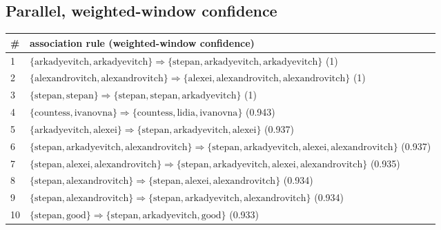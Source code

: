 \begin{appendices}
\section{Parallel, weighted-window confidence}
\label{appendix:rules-par-wwi}

\begin{longtable}{p{20pt}|p{\dimexpr\textwidth-20pt-\tabcolsep\relax}}
\# & association rule (weighted-window confidence) \\
\hline
1 & $ \{ \text{arkadyevitch},\allowbreak\text{arkadyevitch} \} \Rightarrow \{ \text{stepan},\allowbreak\text{arkadyevitch},\allowbreak\text{arkadyevitch} \} $ (1) \\
2 & $ \{ \text{alexandrovitch},\allowbreak\text{alexandrovitch} \} \Rightarrow \{ \text{alexei},\allowbreak\text{alexandrovitch},\allowbreak\text{alexandrovitch} \} $ (1) \\
3 & $ \{ \text{stepan},\allowbreak\text{stepan} \} \Rightarrow \{ \text{stepan},\allowbreak\text{stepan},\allowbreak\text{arkadyevitch} \} $ (1) \\
4 & $ \{ \text{countess},\allowbreak\text{ivanovna} \} \Rightarrow \{ \text{countess},\allowbreak\text{lidia},\allowbreak\text{ivanovna} \} $ (0.943) \\
5 & $ \{ \text{arkadyevitch},\allowbreak\text{alexei} \} \Rightarrow \{ \text{stepan},\allowbreak\text{arkadyevitch},\allowbreak\text{alexei} \} $ (0.937) \\
6 & $ \{ \text{stepan},\allowbreak\text{arkadyevitch},\allowbreak\text{alexandrovitch} \} \Rightarrow \{ \text{stepan},\allowbreak\text{arkadyevitch},\allowbreak\text{alexei},\allowbreak\text{alexandrovitch} \} $ (0.937) \\
7 & $ \{ \text{stepan},\allowbreak\text{alexei},\allowbreak\text{alexandrovitch} \} \Rightarrow \{ \text{stepan},\allowbreak\text{arkadyevitch},\allowbreak\text{alexei},\allowbreak\text{alexandrovitch} \} $ (0.935) \\
8 & $ \{ \text{stepan},\allowbreak\text{alexandrovitch} \} \Rightarrow \{ \text{stepan},\allowbreak\text{alexei},\allowbreak\text{alexandrovitch} \} $ (0.934) \\
9 & $ \{ \text{stepan},\allowbreak\text{alexandrovitch} \} \Rightarrow \{ \text{stepan},\allowbreak\text{arkadyevitch},\allowbreak\text{alexandrovitch} \} $ (0.934) \\
10 & $ \{ \text{stepan},\allowbreak\text{good} \} \Rightarrow \{ \text{stepan},\allowbreak\text{arkadyevitch},\allowbreak\text{good} \} $ (0.933) \\

\end{longtable}
\end{appendices}
